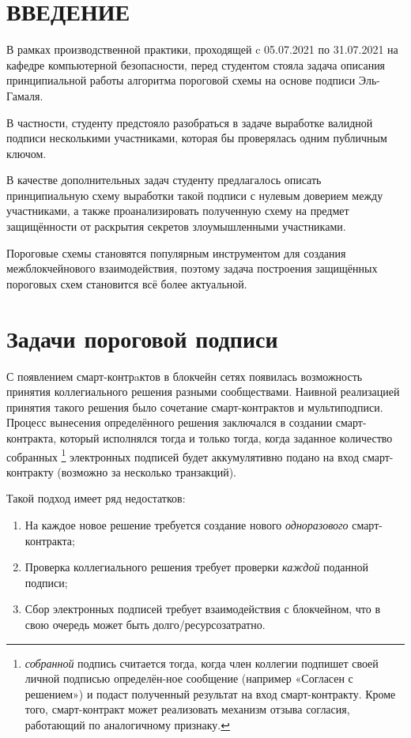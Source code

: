 \documentclass[a4paper,12pt]{article}
\theoremstyle{definition}
\begin{document}
	\newpage
	\tableofcontents
	
	\newpage
	\section*{ВВЕДЕНИЕ}
	
	В рамках производственной практики, проходящей c 05.07.2021 по 31.07.2021 на кафедре компьютерной безопасности, перед студентом стояла задача описания принципиальной работы алгоритма пороговой схемы на основе подписи Эль-Гамаля. 
	
	В частности, студенту предстояло разобраться в задаче выработке валидной подписи несколькими участниками, которая бы проверялась одним публичным ключом. 
	
	В качестве дополнительных задач студенту предлагалось описать принципиальную схему выработки такой подписи с нулевым доверием между участниками, а также проанализировать полученную схему на предмет защищённости от раскрытия секретов злоумышленными участниками. 
	
	Пороговые схемы становятся популярным инструментом для создания межблокчейнового взаимодействия, поэтому задача построения защищённых пороговых схем становится всё более актуальной.
	
	\newpage
	\section{Задачи пороговой подписи }	
	
	С появлением смарт-контрaктов в блокчейн сетях появилась возможность принятия коллегиального решения разными сообществами. Наивной реализацией принятия такого решения было сочетание смарт-контрактов и мультиподписи. Процесс вынесения определённого решения заключался в создании смарт-контракта, который исполнялся тогда и только тогда, когда заданное количество собранных 
	\footnote{\emph{собранной} подпись считается тогда, когда член коллегии подпишет своей личной подписью определён-ное сообщение (например «Согласен с решением») и подаст полученный результат на вход смарт-контракту. Кроме того, смарт-контракт может реализовать механизм отзыва согласия, работающий по аналогичному признаку.}  
	электронных подписей будет аккумулятивно подано на вход смарт-контракту (возможно за несколько транзакций). 
	
	Такой подход имеет ряд недостатков:
	\begin{enumerate}[label=\arabic*)]
		\item На каждое новое решение требуется создание нового \emph{одноразового} смарт-контракта;
		\item Проверка коллегиального решения требует проверки \emph{каждой} поданной подписи;
		\item Сбор электронных подписей требует взаимодействия с блокчейном, что в свою очередь может быть долго/ресурсозатратно.
	\end{enumerate}	
	
\end{document}
